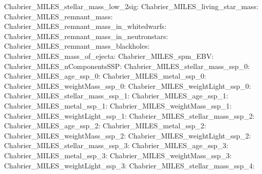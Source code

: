 Chabrier\_MILES\_stellar\_mass\_low\_2sig:  \newline 
Chabrier\_MILES\_living\_star\_mass:  \newline 
Chabrier\_MILES\_remnant\_mass:  \newline 
Chabrier\_MILES\_remnant\_mass\_in\_whitedwarfs:  \newline 
Chabrier\_MILES\_remnant\_mass\_in\_neutronstars:  \newline 
Chabrier\_MILES\_remnant\_mass\_blackholes:  \newline 
Chabrier\_MILES\_mass\_of\_ejecta:  \newline 
Chabrier\_MILES\_spm\_EBV:  \newline 
Chabrier\_MILES\_nComponentsSSP:  \newline 
Chabrier\_MILES\_stellar\_mass\_ssp\_0:  \newline 
Chabrier\_MILES\_age\_ssp\_0:  \newline 
Chabrier\_MILES\_metal\_ssp\_0:  \newline 
Chabrier\_MILES\_weightMass\_ssp\_0:  \newline 
Chabrier\_MILES\_weightLight\_ssp\_0:  \newline 
Chabrier\_MILES\_stellar\_mass\_ssp\_1:  \newline 
Chabrier\_MILES\_age\_ssp\_1:  \newline 
Chabrier\_MILES\_metal\_ssp\_1:  \newline 
Chabrier\_MILES\_weightMass\_ssp\_1:  \newline 
Chabrier\_MILES\_weightLight\_ssp\_1:  \newline 
Chabrier\_MILES\_stellar\_mass\_ssp\_2:  \newline 
Chabrier\_MILES\_age\_ssp\_2:  \newline 
Chabrier\_MILES\_metal\_ssp\_2:  \newline 
Chabrier\_MILES\_weightMass\_ssp\_2:  \newline 
Chabrier\_MILES\_weightLight\_ssp\_2:  \newline 
Chabrier\_MILES\_stellar\_mass\_ssp\_3:  \newline 
Chabrier\_MILES\_age\_ssp\_3:  \newline 
Chabrier\_MILES\_metal\_ssp\_3:  \newline 
Chabrier\_MILES\_weightMass\_ssp\_3:  \newline 
Chabrier\_MILES\_weightLight\_ssp\_3:  \newline 
Chabrier\_MILES\_stellar\_mass\_ssp\_4:  \newline 
